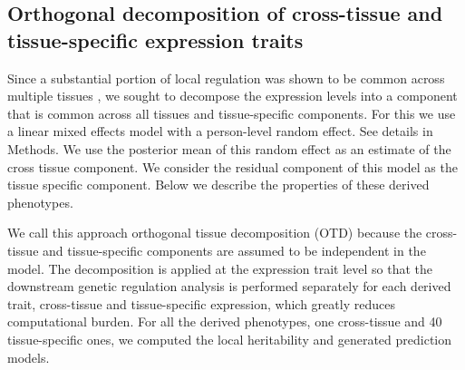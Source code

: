 \documentclass[10pt,letterpaper]{article}
\begin{document}


\subsection*{Orthogonal decomposition of cross-tissue and tissue-specific expression traits}

Since a substantial portion of local regulation was shown to be common across multiple tissues \cite{Ardlie_2015}, we sought to decompose the expression levels into a component that is common across all tissues and tissue-specific components. For this we use a linear mixed effects model with a person-level random effect. See details in Methods. We use the posterior mean of this random effect as an estimate of the cross tissue component. We consider the residual component of this model as the tissue specific component. Below we describe the properties of these derived phenotypes.

We call this approach orthogonal tissue decomposition (OTD) because the cross-tissue and tissue-specific components are assumed to be independent in the model. The decomposition is applied at the expression trait level so that the downstream genetic regulation analysis is performed separately for each derived trait, cross-tissue and tissue-specific expression, which greatly reduces computational burden. For all the derived phenotypes, one cross-tissue and 40 tissue-specific ones, we computed the local heritability and generated prediction models.
\end{document}
